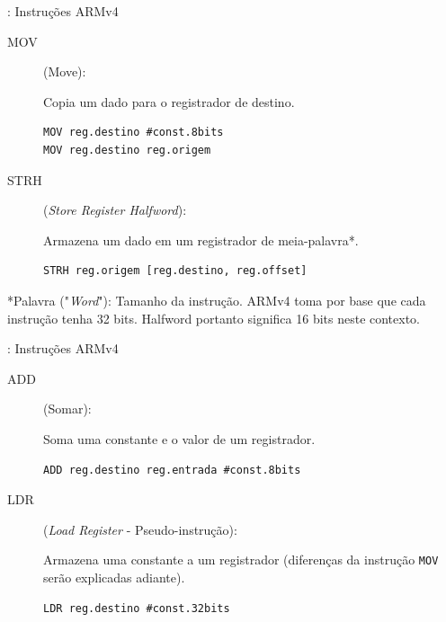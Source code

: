 \documentclass{beamer}
\begin{document}
\begin{darkframes}
    \begin{frame}[fragile]{\secname: Instruções ARMv4}
        \begin{description}
            \item[MOV] (Move):

                Copia um dado para o registrador de destino.

                \begin{verbatim}
MOV reg.destino #const.8bits
MOV reg.destino reg.origem
                \end{verbatim}

            \item[STRH] (\textit{Store Register Halfword}):

                Armazena um dado em um registrador de meia-palavra*.

                \begin{verbatim}
STRH reg.origem [reg.destino, reg.offset]
                \end{verbatim}
        \end{description}

        *Palavra ("\textit{Word}"): Tamanho da instrução. ARMv4 toma por base que cada
        instrução tenha 32 bits. Halfword portanto significa 16 bits neste
        contexto.
\end{frame}

    \begin{frame}[fragile]{\secname: Instruções ARMv4}
        \begin{description}
            \item[ADD] (Somar):

                Soma uma constante e o valor de um registrador.

                \begin{verbatim}
ADD reg.destino reg.entrada #const.8bits
                \end{verbatim}

            \item[LDR] (\textit{Load Register} - Pseudo-instrução):

                Armazena uma constante a um registrador (diferenças da
                instrução \texttt{MOV} serão explicadas adiante).

                \begin{verbatim}
LDR reg.destino #const.32bits
                \end{verbatim}
        \end{description}
\end{frame}


\end{darkframes}
\end{document}
